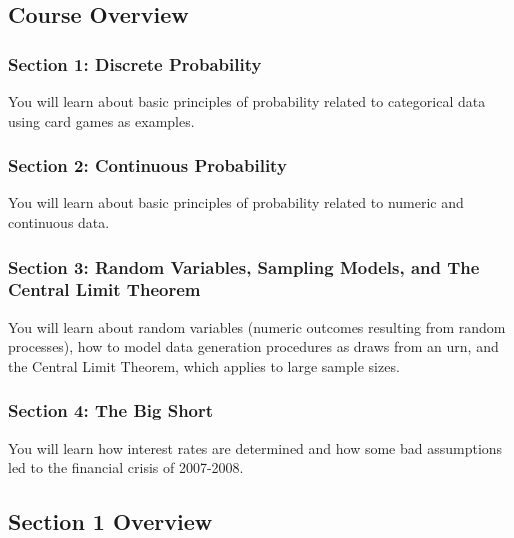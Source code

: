 \documentclass[
]{article}
\begin{document}
\hypertarget{course-overview}{%
\subsection{Course Overview}\label{course-overview}}

\hypertarget{section-1-discrete-probability}{%
\subsubsection{Section 1: Discrete
Probability}\label{section-1-discrete-probability}}

You will learn about basic principles of probability related to
categorical data using card games as examples.

\hypertarget{section-2-continuous-probability}{%
\subsubsection{Section 2: Continuous
Probability}\label{section-2-continuous-probability}}

You will learn about basic principles of probability related to numeric
and continuous data.

\hypertarget{section-3-random-variables-sampling-models-and-the-central-limit-theorem}{%
\subsubsection{Section 3: Random Variables, Sampling Models, and The
Central Limit
Theorem}\label{section-3-random-variables-sampling-models-and-the-central-limit-theorem}}

You will learn about random variables (numeric outcomes resulting from
random processes), how to model data generation procedures as draws from
an urn, and the Central Limit Theorem, which applies to large sample
sizes.

\hypertarget{section-4-the-big-short}{%
\subsubsection{Section 4: The Big Short}\label{section-4-the-big-short}}

You will learn how interest rates are determined and how some bad
assumptions led to the financial crisis of 2007-2008.

\hypertarget{section-1-overview}{%
\subsection{Section 1 Overview}\label{section-1-overview}}
\end{document}
